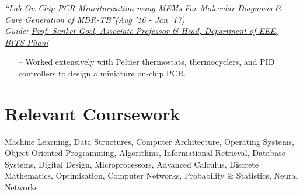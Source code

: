 \documentclass[margin,line]{templates/resume}
\newcommand{\myhref}[3][blue]{\href{#2}{\color{#1}{#3}}}
\newcommand{\compresslist}{%
\setlength{\itemsep}{3pt}%
\setlength{\parskip}{0pt}%
\setlength{\parsep}{0pt}%
}
\begin{document}
\begin{resume}
\vspace{-0.2cm}    
\textsf{\textit{“Lab-On-Chip PCR Miniaturization using MEMs For Molecular Diagnosis \& Cure Generation of MDR-TB”}}\hfill\textit{\small(Aug '16 - Jan '17)}
\\ {\textit{Guide: \href{http://www.bits-pilani.ac.in/hyderabad/sgoel/profile}{ Prof. Sanket Goel, Associate Professor \& Head, Department of EEE, BITS Pilani}}}\hfill{\myhref[darkblue]{https://esha-singh.github.io/\#mpi}{Web}}
\normalsize
\vspace{0.05cm}
\begin{itemize}[leftmargin=*]\compresslist
    \item[--] Worked extensively with  Peltier thermostats, thermocyclers, and  PID controllers to design a miniature on-chip PCR.
   
\end{itemize}

\section{\mysidestyle Relevant Coursework} 
Machine Learning, Data Structures, Computer Architecture, Operating Systems, Object Oriented Programming, Algorithms,  Informational Retrieval, Database Systems, Digital Design, Microprocessors, Advanced Calculus, Discrete Mathematics, Optimisation, Computer Networks, Probability \& Statistics, Neural Networks




\vspace{-0.2cm}    

\end{resume}
\end{document}
